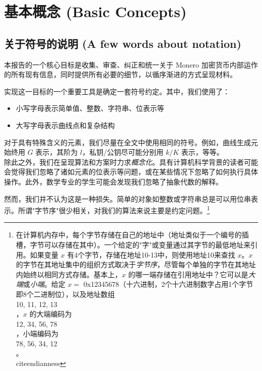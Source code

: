 \chapter{基本概念 (Basic Concepts)}
\label{chapter:basicConcepts}



\section{关于符号的说明 (A few words about notation)}

本报告的一个核心目标是收集、审查、纠正和统一关于 Monero 加密货币内部运作的所有现有信息，同时提供所有必要的细节，以循序渐进的方式呈现材料。

实现这一目标的一个重要工具是确定一套符号约定。其中，我们使用了：

\begin{itemize}
\item 小写字母表示简单值、整数、字符串、位表示等
\item 大写字母表示曲线点和复杂结构
\end{itemize}

对于具有特殊含义的元素，我们尽量在全文中使用相同的符号。例如，曲线生成元始终用 \(G\) 表示，其阶为 \(l\)，私钥/公钥尽可能分别用 \(k/K\) 表示，等等。
\\

除此之外，我们在呈现算法和方案时力求{\em 概念化}。具有计算机科学背景的读者可能会觉得我们忽略了诸如元素的位表示等问题，或在某些情况下忽略了如何执行具体操作。此外，数学专业的学生可能会发现我们忽略了抽象代数的解释。

然而，我们并不认为这是一种损失。简单的对象如整数或字符串总是可以用位串表示。所谓"字节序"很少相关，对我们的算法来说主要是约定问题。\footnote{在计算机内存中，每个字节存储在自己的地址中（地址类似于一个编号的插槽，字节可以存储在其中）。一个给定的"字"或变量通过其字节的最低地址来引用。如果变量 $x$ 有4个字节，存储在地址10-13中，则使用地址10来查找 $x$。$x$ 的字节在其地址集中的组织方式取决于{\em 字节序}，尽管每个单独的字节在其地址内始终以相同方式存储。基本上，$x$ 的哪一端存储在引用地址中？它可以是{\em 大端}或{\em 小端}。给定 $x = $ 0x12345678（十六进制，2个十六进制数字占用1个字节即8个二进制位），以及地址数组 \\{10, 11, 12, 13\\}，$x$ 的大端编码为 \\{12, 34, 56, 78\\}，小端编码为 \\{78, 56, 34, 12\\}。\\cite{endianness}}

